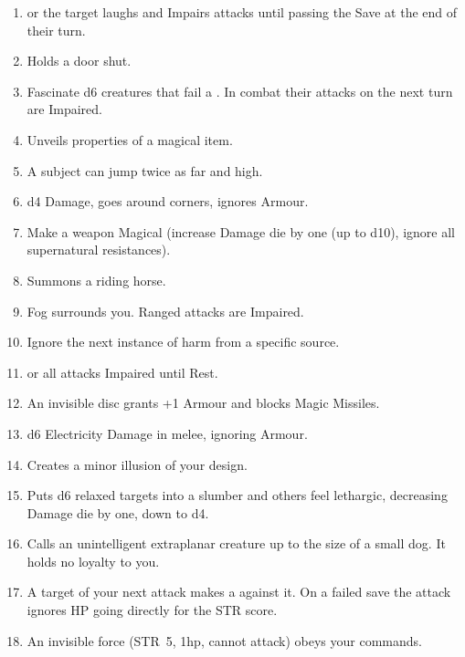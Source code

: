 \documentclass[itdr]{subfiles}
\begin{document}
\begin{enumerate}
	\item {}  or the target laughs and Impairs attacks until passing the Save at the end of their turn.
	\item {} Holds a door shut.
	\item {} Fascinate d6 creatures that fail a . In combat their attacks on the next turn are Impaired.
	\item {} Unveils properties of a magical item.
	\vfill
	\break
	\item {} A subject can jump twice as far and high.
	\item {} d4 Damage, goes around corners, ignores Armour.
	\item {} Make a weapon Magical (increase Damage die by one (up to d10), ignore all supernatural resistances).
	\item {} Summons a riding horse.
	\item {} Fog surrounds you. Ranged attacks are Impaired.
	\item {} Ignore the next instance of harm from a specific source.
	\item {}  or all attacks Impaired until Rest.
	\item {} An invisible disc grants +1 Armour and blocks Magic Missiles.
	\item {} d6 Electricity Damage in melee, ignoring Armour.
	\item {} Creates a minor illusion of your design.
	\item {} Puts d6 relaxed targets into a slumber and others feel lethargic, decreasing Damage die by one, down to d4.
	\item {} Calls an unintelligent extraplanar creature up to the size of a small dog. It holds no loyalty to you.
	\item {} A target of your next attack makes a  against it. On a failed save the attack ignores HP going directly for the STR score.
	\item {} An invisible force (STR~5, 1hp, cannot attack) obeys your commands.
\end{enumerate}


\vfill
\break
\end{document}
